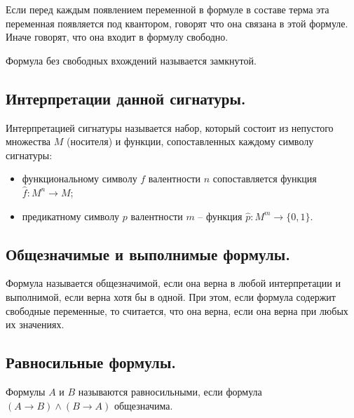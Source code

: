 \begin{definition}
  Если перед каждым появлением переменной в формуле в составе терма эта переменная появляется под квантором, говорят что она связана в этой формуле. Иначе говорят, что она входит в формулу свободно. 
\end{definition}

\begin{definition}
  Формула без свободных вхождений называется замкнутой.
\end{definition}

\subsection{Интерпретации данной сигнатуры.}

\begin{definition}
  Интерпретацией сигнатуры называется набор, который состоит из непустого множества $M$ (носителя) и функции, сопоставленных каждому символу сигнатуры:
  \begin{itemize}
    \item функциональному символу $f$ валентности $n$ сопоставляется функция $\hat{f} : M^n \to M$;
    \item предикатному символу $p$ валентности $m$ -- функция $\hat{p} : M^m \to \{0,1\}$.
  \end{itemize}
\end{definition}

\subsection{Общезначимые и выполнимые формулы.}

\begin{definition}
  Формула называется общезначимой, если она верна в любой интерпретации и выполнимой, если верна хотя бы в одной. При этом, если формула содержит свободные переменные, то считается, что она верна, если она верна при любых их значениях.
\end{definition}

\subsection{Равносильные формулы.}

\begin{definition}
  Формулы $A$ и $B$ называются равносильными, если формула $(A \to B) \wedge (B \to A)$ общезначима.
\end{definition}